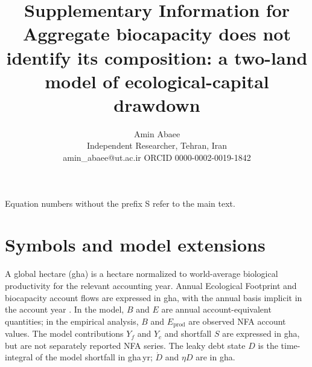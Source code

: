 \documentclass[11pt,a4paper]{article}
\title{Supplementary Information for\\[4pt]
\large Aggregate biocapacity does not identify its composition: a two-land model of ecological-capital drawdown}
\author{Amin Abaee\\ \small Independent Researcher, Tehran, Iran\\ \small amin\_abaee@ut.ac.ir \quad ORCID 0000-0002-0019-1842}
\begin{document}
\maketitle

\noindent Equation numbers without the prefix S refer to the main text.

\section{Symbols and model extensions}\label{si:symbols}

A global hectare (gha) is a hectare normalized to world-average biological productivity for the relevant accounting year. Annual Ecological Footprint and biocapacity account flows are expressed in gha, with the annual basis implicit in the account year \citep{GFNStandards2009,GFNGuidebook2019}. In the model, $B$ and $E$ are annual account-equivalent quantities; in the empirical analysis, $B$ and $E_{\mathrm{prod}}$ are observed NFA account values. The model contributions $Y_f$ and $Y_c$ and shortfall $S$ are expressed in gha, but are not separately reported NFA series. The leaky debt state $D$ is the time-integral of the model shortfall in gha\,yr; $\dot D$ and $\eta D$ are in gha.
\end{document}
